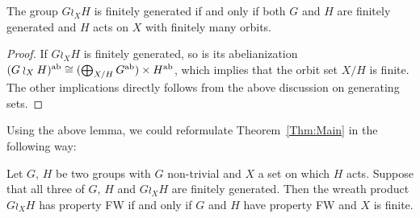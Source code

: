 %
%
\begin{lem}
The group $G\wr_XH$ is finitely generated if and only if both $G$ and $H$ are finitely generated and $H$ acts on $X$ with finitely many orbits.
\end{lem}
\begin{proof}
If $G\wr_XH$ is finitely generated, so is its abelianization $(G\wr_XH)^{\operatorname{ab}}\cong (\bigoplus_{X/H}G^{\operatorname{ab}})\times H^{\operatorname{ab}}$, which implies that the orbit set $X/H$ is finite. The other implications directly follows from the above discussion on generating sets.
\end{proof}
%
%
Using the above lemma, we could reformulate Theorem~\ref{Thm:Main} in the following way:
%
%
\begin{prop}
Let $G$, $H$ be two groups with $G$ non-trivial and $X$ a set on which $H$ acts. Suppose that all three of $G$, $H$ and $G\wr_XH$ are finitely generated. Then the wreath product $G\wr_XH$ has property FW if and only if $G$ and $H$ have property FW and $X$ is finite.
\end{prop}
